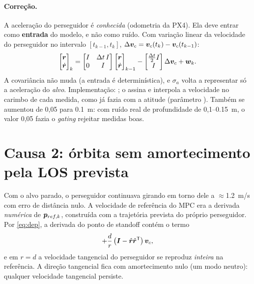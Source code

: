 \paragraph{Correção.} A aceleração do perseguidor é \emph{conhecida} (odometria da PX4).
Ela deve entrar como \textbf{entrada} do modelo, e não como ruído. Com variação linear da
velocidade do perseguidor no intervalo $[t_{k-1},t_k]$,
$\Delta\bm{v}_c=\bm{v}_c(t_k)-\bm{v}_c(t_{k-1})$:
\begin{equation}
  \begin{bmatrix}\bm{r}\\ \dot{\bm{r}}\end{bmatrix}_k
  = \begin{bmatrix}I & \Delta t\,I\\ 0 & I\end{bmatrix}
    \begin{bmatrix}\bm{r}\\ \dot{\bm{r}}\end{bmatrix}_{k-1}
  - \begin{bmatrix}\tfrac{\Delta t}{2}I\\ I\end{bmatrix}\Delta\bm{v}_c + \bm{w}_k .
\end{equation}
A covariância não muda (a entrada é determinística), e $\sigma_a$ volta a representar só
a aceleração do \emph{alvo}. Implementação: ;
o  assina  e interpola a
velocidade no carimbo de cada medida, como já fazia com a atitude (parâmetro
). Também se aumentou  de
0,05 para \SI{0,1}{m}: com ruído real de profundidade de 0,1--\SI{0,15}{m}, o valor 0,05
fazia o \emph{gating} rejeitar medidas boas.

\section{Causa 2: órbita sem amortecimento pela LOS prevista}
Com o alvo parado, o perseguidor continuava girando em torno dele a $\approx$\SI{1,2}{m/s}
com erro de distância nulo. A velocidade de referência do MPC era a derivada
\emph{numérica} de $\bm{p}_{ref,k}$, construída com a trajetória prevista do próprio
perseguidor. Por \eqref{eq:dep}, a derivada do ponto de standoff contém o termo
\begin{equation}
  +\frac{d}{r}\left(\bm{I}-\hat{\bm{r}}\hat{\bm{r}}^{\mathsf{T}}\right)\bm{v}_c ,
\end{equation}
e em $r=d$ a velocidade tangencial do perseguidor se reproduz \emph{inteira} na
referência. A direção tangencial fica com amortecimento nulo (um modo neutro): qualquer
velocidade tangencial persiste.

